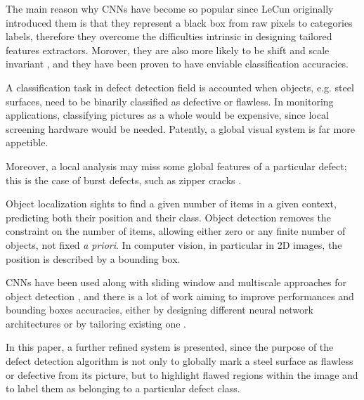     \par{
        The main reason why CNNs have become so popular since LeCun originally introduced them \cite{nips:NIPS1989_293, ieee:726791, LeCun:1999:ORG:646469.691875, researchgate:deeplearning} is that they represent a black box from raw pixels to categories labels, therefore they overcome the difficulties intrinsic in designing tailored features extractors. Morover, they are also more likely to be shift and scale invariant \cite{LeCun:1999:ORG:646469.691875}, and they have been proven to have enviable classification accuracies.
    }
    \par{
        A classification task in defect detection field is accounted when objects, e.g. steel surfaces, need to be binarily classified as defective or flawless. In monitoring applications, classifying pictures as a whole would be expensive, since local screening hardware would be needed. Patently, a global visual system is far more appetible. 
    }
    \par{
        Moreover, a local analysis may miss some global features of a particular defect; this is the case of burst defects, such as zipper cracks \cite{defects:mainlinemetals}.
    }
    \par{
        Object localization sights to find a given number of items in a given context, predicting both their position and their class. Object detection removes the constraint on the number of items, allowing either zero or any finite number of objects, not fixed \emph{a priori}. In computer vision, in particular in 2D images, the position is described by a bounding box.
    }
    \par{
        CNNs have been used along with sliding window and multiscale approaches for object detection \cite{ieee:7410526, ieee:7532516, arXiv:1312.6229S}, and there is a lot of work aiming to improve performances and bounding boxes accuracies, either by designing different neural network architectures \cite{ieee:7410526} or by tailoring existing one \cite{ieee:726791}.
    }
    \par{
        In this paper, a further refined system is presented, since the purpose of the defect detection algorithm is not only to globally mark a steel surface as flawless or defective from its picture, but to highlight flawed regions within the image and to label them as belonging to a particular defect class.
    }
